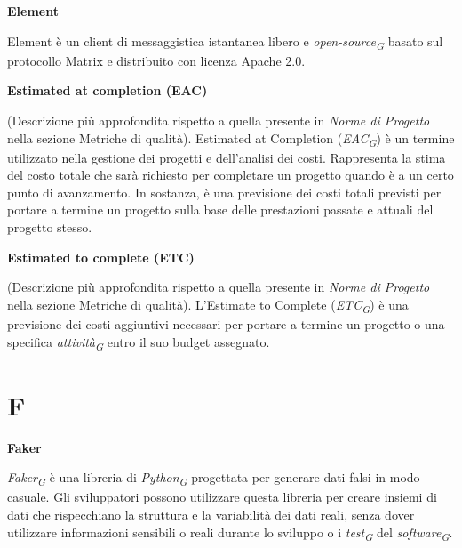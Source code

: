\documentclass{article}
\begin{document}
\vspace{0.4cm}

\textbf{Element}

\vspace{0.1cm}

Element è un client di messaggistica istantanea libero e \textit{open-source}\textsubscript{\textit{G}} basato sul protocollo Matrix e distribuito con licenza Apache 2.0.

\vspace{0.4cm}

\textbf{Estimated at completion (EAC)}

\vspace{0.1cm}

(Descrizione più approfondita rispetto a quella presente in \textit{Norme di Progetto} nella sezione Metriche di qualità). Estimated at Completion (\textit{EAC}\textsubscript{\textit{G}}) è un termine utilizzato nella gestione dei progetti e dell'analisi dei costi. Rappresenta la stima del costo totale che sarà richiesto per completare un progetto quando è a un certo punto di avanzamento. In sostanza, è una previsione dei costi totali previsti per portare a termine un progetto sulla base delle prestazioni passate e attuali del progetto stesso.

\vspace{0.4cm}

\textbf{Estimated to complete (ETC)}

\vspace{0.1cm}

(Descrizione più approfondita rispetto a quella presente in \textit{Norme di Progetto} nella sezione Metriche di qualità). L'Estimate to Complete (\textit{ETC}\textsubscript{\textit{G}}) è una previsione dei costi aggiuntivi necessari per portare a termine un progetto o una specifica \textit{attività}\textsubscript{\textit{G}} entro il suo budget assegnato.

\pagebreak
\section*{F}
{}

\vspace{0.4cm}

\textbf{Faker}

\vspace{0.1cm}

\textit{Faker}\textsubscript{\textit{G}} è una libreria di \textit{Python}\textsubscript{\textit{G}} progettata per generare dati falsi in modo casuale. Gli sviluppatori possono utilizzare questa libreria per creare insiemi di dati che rispecchiano la struttura e la variabilità dei dati reali, senza dover utilizzare informazioni sensibili o reali durante lo sviluppo o i \textit{test}\textsubscript{\textit{G}} del \textit{software}\textsubscript{\textit{G}}.
\end{document}
